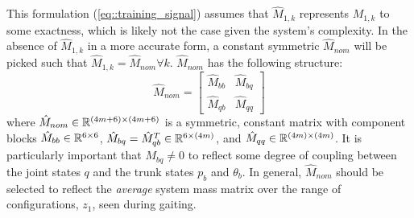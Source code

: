 This formulation (\ref{eq::training_signal}) assumes that $\hat{M}_{1,k}$ represents $M_{1,k}$ to some exactness, which is likely not the case given the system's complexity. 
In the absence of $\hat{M}_{1,k}$ in a more accurate form, a constant symmetric $\hat{M}_{nom}$ will be picked such that $\hat{M}_{1,k} = \hat{M}_{nom} \forall k$. 
$\hat{M}_{nom}$ has the following structure:
	\begin{equation}
		\hat{M}_{nom} = \left[
			\begin{array}{cc}
			\hat{M}_{bb}	&	 \hat{M}_{bq}\\
			\hat{M}_{qb}	&	 \hat{M}_{qq}
			\end{array}
		\right]
	\end{equation}
where $\hat{M}_{nom}\in \mathbb{R}^{(4m+6)\times(4m+6)}$ is a symmetric, constant matrix with component blocks $\hat{M}_{bb}\in \mathbb{R}^{6\times6}$, 
$\hat{M}_{bq}=\hat{M}_{qb}^{T} \in \mathbb{R}^{6\times(4m)}$, and  $\hat{M}_{qq}\in \mathbb{R}^{(4m)\times(4m)}$. It is particularly important that $M_{bq}\neq0$ 
to reflect some degree of coupling between the joint states $q$ and the trunk states $p_{b}$ and $\theta_{b}$. In general, $\hat{M}_{nom}$ should
be selected to reflect the \emph{average} system mass matrix over the range of configurations, $z_{1}$, seen during gaiting. 

